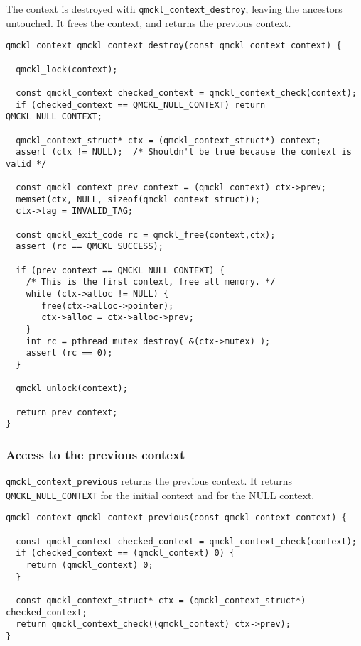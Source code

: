 The context is destroyed with \texttt{qmckl\_context\_destroy}, leaving the ancestors untouched.
It frees the context, and returns the previous context.

\begin{verbatim}
qmckl_context qmckl_context_destroy(const qmckl_context context) {

  qmckl_lock(context);
  
  const qmckl_context checked_context = qmckl_context_check(context);
  if (checked_context == QMCKL_NULL_CONTEXT) return QMCKL_NULL_CONTEXT;

  qmckl_context_struct* ctx = (qmckl_context_struct*) context;
  assert (ctx != NULL);  /* Shouldn't be true because the context is valid */

  const qmckl_context prev_context = (qmckl_context) ctx->prev;
  memset(ctx, NULL, sizeof(qmckl_context_struct));
  ctx->tag = INVALID_TAG;

  const qmckl_exit_code rc = qmckl_free(context,ctx);
  assert (rc == QMCKL_SUCCESS);

  if (prev_context == QMCKL_NULL_CONTEXT) {
    /* This is the first context, free all memory. */
    while (ctx->alloc != NULL) {
       free(ctx->alloc->pointer);
       ctx->alloc = ctx->alloc->prev;
    }
    int rc = pthread_mutex_destroy( &(ctx->mutex) );
    assert (rc == 0);
  }
  
  qmckl_unlock(context);

  return prev_context;
}
\end{verbatim}
\subsubsection{Access to the previous context}
\label{sec:orgaff8db0}

\texttt{qmckl\_context\_previous} returns the previous context. It returns
\texttt{QMCKL\_NULL\_CONTEXT} for the initial context and for the NULL context.

\begin{verbatim}
qmckl_context qmckl_context_previous(const qmckl_context context) {

  const qmckl_context checked_context = qmckl_context_check(context);
  if (checked_context == (qmckl_context) 0) {
    return (qmckl_context) 0;
  }

  const qmckl_context_struct* ctx = (qmckl_context_struct*) checked_context;
  return qmckl_context_check((qmckl_context) ctx->prev);
}
\end{verbatim}
